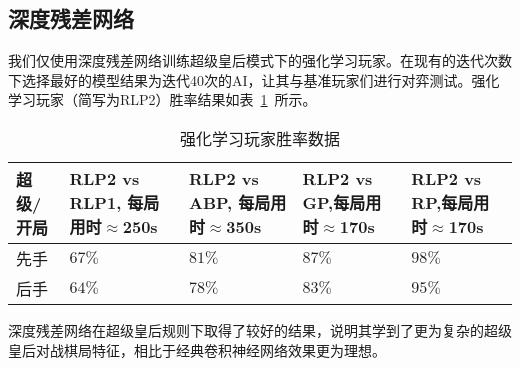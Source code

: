 \subsection{深度残差网络}
我们仅使用深度残差网络训练超级皇后模式下的强化学习玩家。在现有的迭代次数下选择最好的模型结果为迭代40次的AI，让其与基准玩家们进行对弈测试。强化学习玩家（简写为RLP2）胜率结果如表~\ref{table:airesult2}~所示。
\begin{table}[H]
    \centering
    \caption[airesult2]{强化学习玩家胜率数据}
    \begin{tabular}{p{2cm}<{\centering} p{3cm}<{\centering} p{3cm}<{\centering} p{3cm}<{\centering} p{3cm}<{\centering}}
    \hline
    超级/开局 & RLP2 vs RLP1, 每局用时$\approx$250s & RLP2 vs ABP, 每局用时$\approx$350s & RLP2 vs GP,每局用时$\approx$170s & RLP2 vs RP,每局用时$\approx$170s \\ \hline
    先手 & $67\%$ & $81\%$ & $87\%$ & $98\%$\\ 
    后手 & $64\%$ & $78\%$ & $83\%$ & $95\%$\\ \hline
    \end{tabular}
    \label{table:airesult2}
  \end{table}

深度残差网络在超级皇后规则下取得了较好的结果，说明其学到了更为复杂的超级皇后对战棋局特征，相比于经典卷积神经网络效果更为理想。

